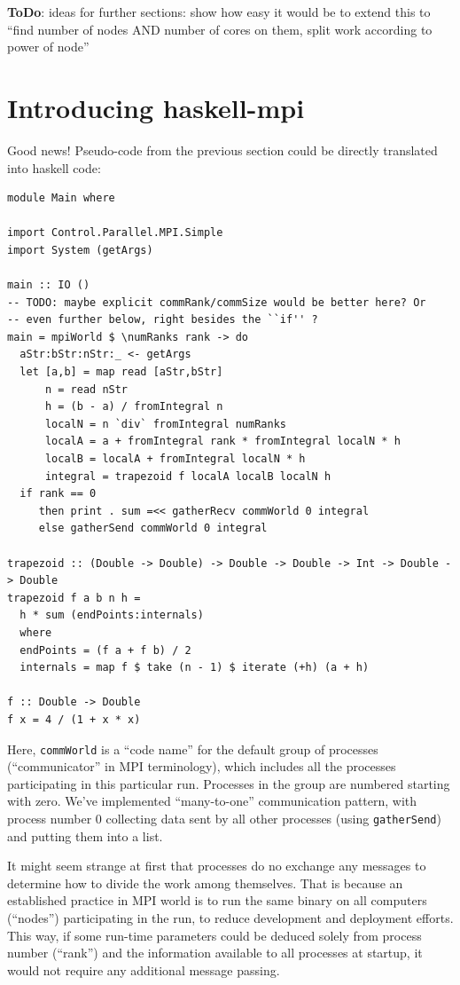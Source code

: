 \documentclass{tmr}
\newcommand{\ToDo}[1]{\textbf{ToDo}{#1}}
\begin{document}
\ToDo: ideas for further sections: show how easy it would be to extend this to ``find number of nodes AND number of cores on them, split work according to power of node''


\section{Introducing haskell-mpi}

Good news! Pseudo-code from the previous section could be directly translated into haskell code:

\begin{Verbatim}
module Main where

import Control.Parallel.MPI.Simple
import System (getArgs)

main :: IO ()
-- TODO: maybe explicit commRank/commSize would be better here? Or
-- even further below, right besides the ``if'' ?
main = mpiWorld $ \numRanks rank -> do
  aStr:bStr:nStr:_ <- getArgs
  let [a,b] = map read [aStr,bStr]
      n = read nStr
      h = (b - a) / fromIntegral n
      localN = n `div` fromIntegral numRanks
      localA = a + fromIntegral rank * fromIntegral localN * h
      localB = localA + fromIntegral localN * h
      integral = trapezoid f localA localB localN h
  if rank == 0
     then print . sum =<< gatherRecv commWorld 0 integral
     else gatherSend commWorld 0 integral

trapezoid :: (Double -> Double) -> Double -> Double -> Int -> Double -> Double
trapezoid f a b n h =
  h * sum (endPoints:internals)
  where
  endPoints = (f a + f b) / 2
  internals = map f $ take (n - 1) $ iterate (+h) (a + h)

f :: Double -> Double
f x = 4 / (1 + x * x)
\end{Verbatim}

Here, \verb|commWorld| is a ``code name'' for the default group of processes
(``communicator'' in MPI terminology), which includes all the
processes participating in this particular run. Processes in the group
are numbered starting with zero. We've implemented
``many-to-one'' communication pattern, with process number 0
collecting data sent by all other processes (using \verb|gatherSend|)
and putting them into a list.

It might seem strange at first that processes do no exchange any
messages to determine how to divide the work among themselves. That is
because an established practice in MPI world is to run the same binary
on all computers (``nodes'') participating in the run, to reduce
development and deployment efforts. This way, if some run-time
parameters could be deduced solely from process number (``rank'') and
the information available to all processes at startup, it would not
require any additional message passing.
\end{document}
